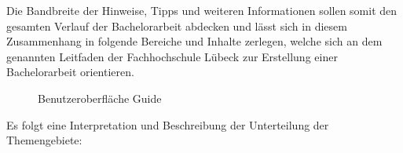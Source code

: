 \documentclass[bibliography=totoc,listof=totoc,BCOR=5mm,DIV=12,oneside]{scrbook}
\begin{document}
\par\bigskip Die Bandbreite der Hinweise, Tipps und weiteren Informationen sollen somit den gesamten Verlauf der Bachelorarbeit abdecken und lässt sich in diesem Zusammenhang in folgende Bereiche und Inhalte zerlegen, welche sich an dem genannten Leitfaden der Fachhochschule Lübeck zur Erstellung einer Bachelorarbeit orientieren.

\bigskip
\begin{figure}[H]
\centering
	\caption{Benutzeroberfläche Guide}
	\label{img:guide}
\end{figure}

\newpage
\par\bigskip Es folgt eine Interpretation und Beschreibung der Unterteilung der Themengebiete:
\end{document}
